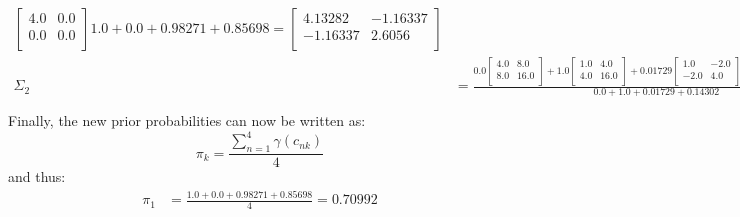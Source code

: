 \documentclass{exam}
\begin{document}
\begin{questions}
\begin{itemize}
\begin{align*}
{\begin{bmatrix}
                    4.0 & 0.0 \\
                    0.0 & 0.0 \\
                \end{bmatrix}
                }{1.0 + 0.0 + 0.98271 + 0.85698} = 
                \begin{bmatrix}
                    4.13282 & -1.16337 \\
                    -1.16337 & 2.6056 \\
                \end{bmatrix}\\
                \Sigma_2 &= \frac{0.0
                \begin{bmatrix}
                    4.0 & 8.0 \\
                    8.0 & 16.0 \\
                \end{bmatrix} + 1.0
                \begin{bmatrix}
                    1.0 & 4.0 \\
                    4.0 & 16.0 \\
                \end{bmatrix} + 0.01729
                \begin{bmatrix}
                    1.0 & -2.0 \\
                    -2.0 & 4.0 \\
                \end{bmatrix} + 0.14302
                \begin{bmatrix}
                    4.0 & 0.0 \\
                    0.0 & 0.0 \\
                \end{bmatrix}
                }{0.0 + 1.0 + 0.01729 + 0.14302} = 
                \begin{bmatrix}
                    2.70166 & 2.10624 \\
                    2.10624 & 2.16924 \\
                \end{bmatrix}
            \end{align*}
            Finally, the new prior probabilities can now be written as:
            \[
                \pi_k = \frac{\sum_{n = 1}^{4}\gamma(c_{nk})}{4}
            \] 
            and thus:
            \begin{align*}
                \pi_1 &= \frac{1.0 + 0.0 + 0.98271 + 0.85698}{4} = 0.70992 \\

\end{align*}
\end{itemize}
\end{questions}
\end{document}
